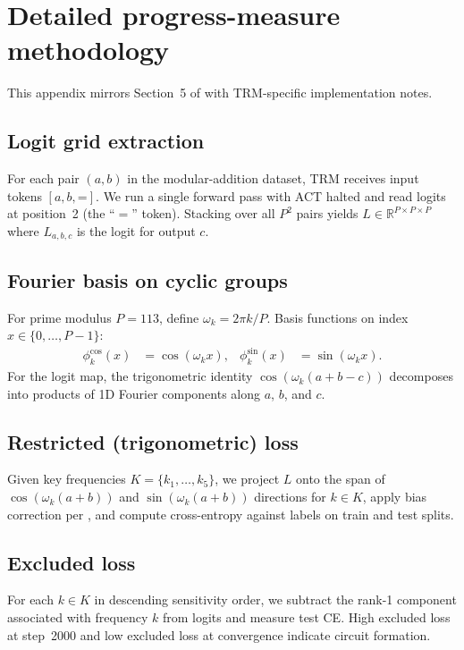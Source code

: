\section{Detailed progress-measure methodology}
\label{app:detailed_methods}

This appendix mirrors Section~5 of \citet{nanda2023progress} with TRM-specific implementation notes.

\subsection{Logit grid extraction}
For each pair $(a,b)$ in the modular-addition dataset, TRM receives input tokens $[a, b, \texttt{=}]$.
We run a single forward pass with ACT halted and read logits at position~2 (the ``$=$'' token).
Stacking over all $P^2$ pairs yields $L \in \mathbb{R}^{P \times P \times P}$ where $L_{a,b,c}$ is the logit for output $c$.

\subsection{Fourier basis on cyclic groups}
For prime modulus $P=113$, define $\omega_k = 2\pi k / P$.
Basis functions on index $x \in \{0,\ldots,P-1\}$:
\begin{align}
  \phi_k^{\cos}(x) &= \cos(\omega_k x), &
  \phi_k^{\sin}(x) &= \sin(\omega_k x).
\end{align}
For the logit map, the trigonometric identity $\cos(\omega_k(a+b-c))$ decomposes into products of 1D Fourier components along $a$, $b$, and $c$.

\subsection{Restricted (trigonometric) loss}
Given key frequencies $K = \{k_1,\ldots,k_5\}$, we project $L$ onto the span of $\cos(\omega_k(a+b))$ and $\sin(\omega_k(a+b))$ directions for $k \in K$, apply bias correction per \citet{nanda2023progress}, and compute cross-entropy against labels on train and test splits.

\subsection{Excluded loss}
For each $k \in K$ in descending sensitivity order, we subtract the rank-1 component associated with frequency $k$ from logits and measure test CE.
High excluded loss at step~2000 and low excluded loss at convergence indicate circuit formation.

